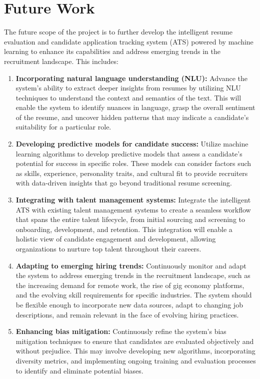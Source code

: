 \section{Future Work}
The future scope of the project is to further develop the intelligent resume evaluation and candidate application tracking system (ATS) powered by machine learning to enhance its capabilities and address emerging trends in the recruitment landscape. This includes:
\begin{enumerate}
    \item \textbf{Incorporating natural language understanding (NLU):} Advance the system's ability to extract deeper insights from resumes by utilizing NLU techniques to understand the context and semantics of the text. This will enable the system to identify nuances in language, grasp the overall sentiment of the resume, and uncover hidden patterns that may indicate a candidate's suitability for a particular role.
    \item \textbf{Developing predictive models for candidate success:} Utilize machine learning algorithms to develop predictive models that assess a candidate's potential for success in specific roles. These models can consider factors such as skills, experience, personality traits, and cultural fit to provide recruiters with data-driven insights that go beyond traditional resume screening.
    \item \textbf{Integrating with talent management systems:} Integrate the intelligent ATS with existing talent management systems to create a seamless workflow that spans the entire talent lifecycle, from initial sourcing and screening to onboarding, development, and retention. This integration will enable a holistic view of candidate engagement and development, allowing organizations to nurture top talent throughout their careers.
    \item \textbf{Adapting to emerging hiring trends:} Continuously monitor and adapt the system to address emerging trends in the recruitment landscape, such as the increasing demand for remote work, the rise of gig economy platforms, and the evolving skill requirements for specific industries. The system should be flexible enough to incorporate new data sources, adapt to changing job descriptions, and remain relevant in the face of evolving hiring practices.
    \item \textbf{Enhancing bias mitigation:} Continuously refine the system's bias mitigation techniques to ensure that candidates are evaluated objectively and without prejudice. This may involve developing new algorithms, incorporating diversity metrics, and implementing ongoing training and evaluation processes to identify and eliminate potential biases.

\end{enumerate}
